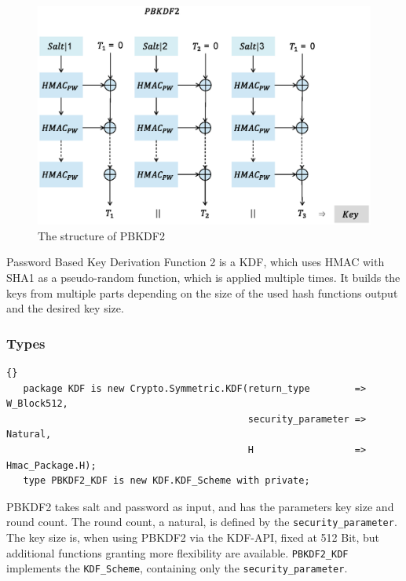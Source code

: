 \begin{figure}[ht!]
\centering
\includegraphics[width=150mm]{./images/PBKDF2}
\caption{The structure of PBKDF2}
\end{figure}

Password Based Key Derivation Function 2 is a KDF, which uses HMAC with SHA1 as a pseudo-random function, which is applied multiple times. It builds the keys from multiple parts depending on the size of the used hash functions output and the desired key size. 
\subsubsection*{Types}
\begin{lstlisting}{}
   package KDF is new Crypto.Symmetric.KDF(return_type        => W_Block512,
                                           security_parameter => Natural,
                                           H                  => Hmac_Package.H);
   type PBKDF2_KDF is new KDF.KDF_Scheme with private;

\end{lstlisting}
PBKDF2 takes salt and password as input, and has the parameters key size and round count. The round count, a natural, is defined by the \texttt{security\_parameter}. The key size is, when using PBKDF2 via the KDF-API, fixed at 512 Bit, but additional functions granting more flexibility are available. \texttt{PBKDF2\_KDF} implements the \texttt{KDF\_Scheme}, containing only the \texttt{security\_parameter}. 

